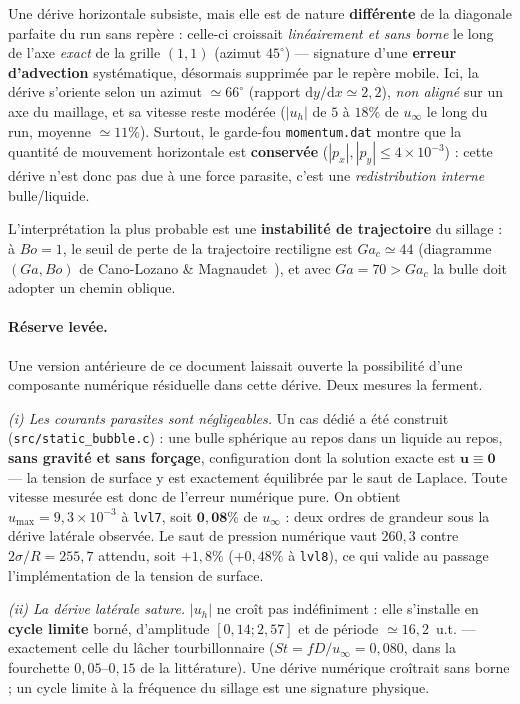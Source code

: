 Une dérive horizontale subsiste, mais elle est de nature \textbf{différente} de la
\og{}diagonale parfaite\fg{} du run sans repère : celle-ci croissait
\emph{linéairement et sans borne} le long de l'axe \emph{exact} de la grille $(1,1)$
(azimut $45^\circ$) --- signature d'une \textbf{erreur d'advection} systématique, désormais
supprimée par le repère mobile. Ici, la dérive s'oriente selon un azimut
${\simeq}66^\circ$ (rapport $\mathrm{d}y/\mathrm{d}x\simeq2{,}2$), \emph{non aligné} sur
un axe du maillage, et sa vitesse reste modérée ($|u_h|$ de $5$ à $18\%$ de
$u_\infty$ le long du run, moyenne ${\simeq}11\%$). Surtout, le garde-fou
\texttt{momentum.dat} montre que la quantité de mouvement horizontale est
\textbf{conservée} ($|p_x|,|p_y|\le4\times10^{-3}$) : cette dérive n'est donc pas due
à une force parasite, c'est une \emph{redistribution interne} bulle/liquide.

L'interprétation la plus probable est une \textbf{instabilité de trajectoire} du
sillage : à $Bo=1$, le seuil de perte de la trajectoire rectiligne est
$Ga_c\simeq44$ (diagramme $(Ga,Bo)$ de Cano-Lozano \& Magnaudet~\cite{canolozano2016}), et avec
$Ga=70>Ga_c$ la bulle doit adopter un chemin oblique.

\paragraph{Réserve levée.} Une version antérieure de ce document laissait ouverte
la possibilité d'une \og{}composante numérique résiduelle\fg{} dans cette dérive.
Deux mesures la ferment.

\emph{(i) Les courants parasites sont négligeables.} Un cas dédié a été construit
(\texttt{src/static\_bubble.c}) : une bulle sphérique au repos dans un liquide au
repos, \textbf{sans gravité et sans forçage}, configuration dont la solution exacte
est $\mathbf{u\equiv0}$ --- la tension de surface y est exactement équilibrée par le
saut de Laplace. Toute vitesse mesurée est donc de l'erreur numérique pure. On
obtient $u_{\max}=9{,}3\times10^{-3}$ à \texttt{lvl7}, soit $\mathbf{0{,}08\%}$ de
$u_\infty$ : deux ordres de grandeur sous la dérive latérale observée. Le saut de
pression numérique vaut $260{,}3$ contre $2\sigma/R=255{,}7$ attendu, soit $+1{,}8\%$
($+0{,}48\%$ à \texttt{lvl8}), ce qui valide au passage l'implémentation de la
tension de surface.

\emph{(ii) La dérive latérale sature.} $|u_h|$ ne croît pas indéfiniment : elle
s'installe en \textbf{cycle limite} borné, d'amplitude $[0{,}14;2{,}57]$ et de
période ${\simeq}16{,}2$~u.t. --- exactement celle du lâcher tourbillonnaire
($St = fD/u_\infty = 0{,}080$, dans la fourchette $0{,}05$--$0{,}15$ de la
littérature). Une dérive numérique croîtrait sans borne ; un cycle limite à la
fréquence du sillage est une signature physique.

